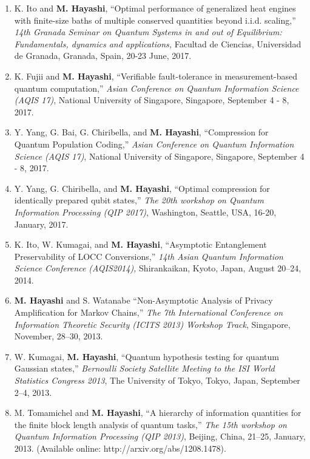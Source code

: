 \documentclass[a4paper,12pt,oneside]{article}
\begin{document}
\begin{enumerate}
\item 
K. Ito and \textbf{M. Hayashi}, 
``Optimal performance of generalized heat engines with finite-size baths of multiple conserved quantities beyond i.i.d. scaling,'' 
{\em 14th Granada Seminar on Quantum Systems
in and out of Equilibrium: Fundamentals, dynamics and applications,} 
Facultad de Ciencias, Universidad de Granada, Granada, Spain, 20-23 June, 2017.

\item 
K. Fujii and \textbf{M. Hayashi}, ``Verifiable fault-tolerance in measurement-based quantum computation,'' 
{\em Asian Conference on Quantum Information Science (AQIS 17)}, 
National University of Singapore, Singapore, September 4 - 8, 2017.

\item 
Y. Yang, G. Bai, G. Chiribella, and \textbf{M. Hayashi}, ``Compression for Quantum Population Coding,'' 
{\em Asian Conference on Quantum Information Science (AQIS 17)}, 
National University of Singapore, Singapore, September 4 - 8, 2017.

\item 
Y. Yang, G. Chiribella, and \textbf{M. Hayashi}, ``Optimal compression for identically prepared qubit states,'' 
{\em The 20th workshop on Quantum Information Processing (QIP 2017)}, 
Washington, Seattle, USA, 16-20, January, 2017.

\item 
K. Ito, W. Kumagai, and \textbf{M. Hayashi}, 
``Asymptotic Entanglement Preservability of LOCC Conversions,'' 
{\em 14th Asian Quantum Information Science Conference (AQIS2014),} Shirankaikan, Kyoto, Japan, August 20--24, 2014.

\item 
\textbf{M. Hayashi} and S. Watanabe
``Non-Asymptotic Analysis of Privacy Amplification for Markov Chains,''
{\em The 7th International Conference on Information Theoretic Security (ICITS 2013) Workshop Track},
Singapore, November, 28--30, 2013.

\item
W. Kumagai, \textbf{M. Hayashi}, 
``Quantum hypothesis testing for quantum Gaussian states,'' 
{\em Bernoulli Society Satellite Meeting to the ISI World Statistics Congress 2013}, 
The University of Tokyo, Tokyo, Japan,
September 2--4, 2013.

\item 
M. Tomamichel and \textbf{M. Hayashi}, ``A hierarchy of information quantities for the finite block length analysis of quantum tasks,''
{\em The 15th workshop on Quantum Information Processing (QIP 2013)}, Beijing, China, 21--25, January, 2013.
(Available online: http://arxiv.org/abs/1208.1478).


\end{enumerate}
\end{document}
